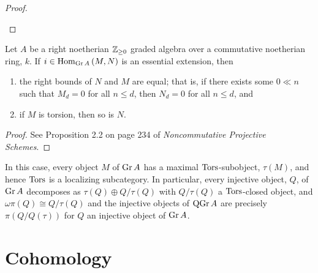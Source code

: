 \documentclass[dissertation.tex]{subfiles}
\begin{document}
\begin{cor}
\begin{proof}
\begin{enumerate}
    \end{enumerate}
  \end{proof}
\end{cor}

\begin{prop}
  Let $A$ be a right noetherian $\mathbb{Z}_{\geq 0}$ graded algebra over a commutative noetherian ring, $k$.
  If $i \in \operatorname{Hom}_{\operatorname{Gr}A}\left(M, N\right)$ is an essential extension, then
  \begin{enumerate}
  \item
    the right bounds of $N$ and $M$ are equal; that is, if there exists some $0 \ll n$ such that $M_d = 0$ for all $n \leq d$, then $N_d = 0$ for all $n \leq d$, and
  \item
    if $M$ is torsion, then so is $N$.
  \end{enumerate}
  \begin{proof}
    See Proposition 2.2 on page 234 of {\it Noncommutative Projective Schemes}.
  \end{proof}
\end{prop}

\begin{rmk}
  In this case, every object $M$ of $\operatorname{Gr}A$ has a maximal $\Tors$-subobject, $\tau(M)$, and hence $\Tors$ is a localizing subcategory.
  In particular, every injective object, $Q$, of $\operatorname{Gr}A$ decomposes as $\tau(Q) \oplus Q/\tau(Q)$ with $Q/\tau(Q)$ a $\Tors$-closed object, and $\omega\pi(Q) \cong Q/\tau(Q)$ and
  the injective objects of $\operatorname{QGr}A$ are precisely $\pi(Q/Q(\tau))$ for $Q$ an injective object of $\operatorname{Gr}A$.
\end{rmk}

\section{Cohomology}
\end{document}
